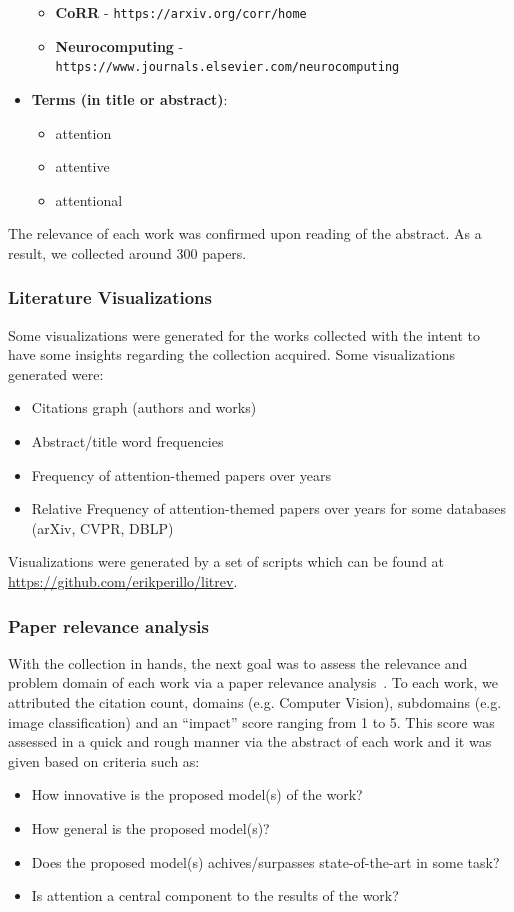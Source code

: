 \documentclass[12pt]{article}
\begin{document}
\begin{itemize}
\begin{itemize}
        \item \textbf{CoRR} - \texttt{https://arxiv.org/corr/home}
        \item \textbf{Neurocomputing} - \texttt{https://www.journals.elsevier.com/neurocomputing}
    \end{itemize}
    \item \textbf{Terms (in title or abstract)}:
    \begin{itemize}
        \item attention
        \item attentive
        \item attentional
    \end{itemize}
\end{itemize}

The relevance of each work was confirmed upon reading of the abstract.
As a result, we collected around 300 papers.

\subsubsection{Literature Visualizations}
Some visualizations were generated for the works collected with the intent
to have some insights regarding the collection acquired.
Some visualizations generated were:
\begin{itemize}
    \item Citations graph (authors and works)
    \item Abstract/title word frequencies
    \item Frequency of attention-themed papers over years
    \item Relative Frequency of attention-themed papers over years for some databases (arXiv, CVPR, DBLP)
\end{itemize}
Visualizations were generated by a set of scripts which can be found at \url{https://github.com/erikperillo/litrev}.

\subsubsection{Paper relevance analysis}
With the collection in hands, the next goal was to assess the relevance and problem domain of each work
via a paper relevance analysis~\cite{ref:paper-relevance}.
To each work, we attributed the citation count, domains (e.g. Computer Vision), subdomains (e.g. image classification)
and an ``impact'' score ranging from 1 to 5. This score was assessed in a quick and rough manner via the abstract of each
work and it was given based on criteria such as:
\begin{itemize}
    \item How innovative is the proposed model(s) of the work?
    \item How general is the proposed model(s)?
    \item Does the proposed model(s) achives/surpasses state-of-the-art in some task?
    \item Is attention a central component to the results of the work?
\end{itemize}
\end{document}
